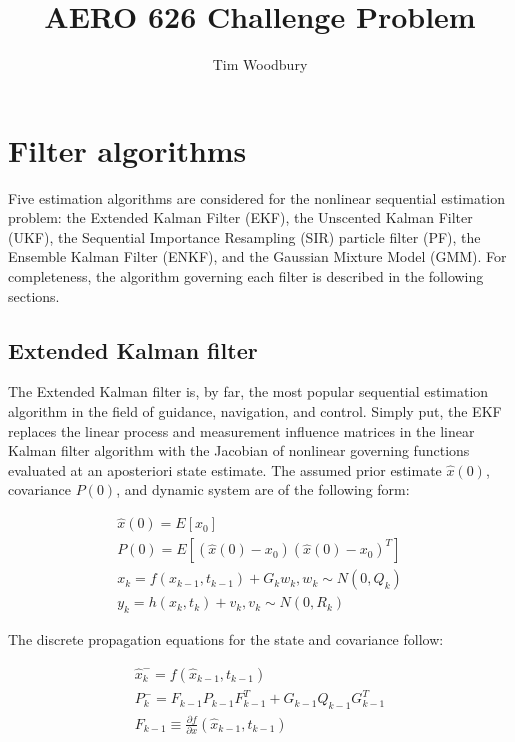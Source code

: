 \documentclass[]{article}
\title{AERO 626 Challenge Problem}
\author{Tim Woodbury}
\begin{document}

\maketitle

\section{Filter algorithms}

Five estimation algorithms are considered for the nonlinear sequential estimation problem: the Extended Kalman Filter (EKF), the Unscented Kalman Filter (UKF), the Sequential Importance Resampling (SIR) particle filter (PF), the Ensemble Kalman Filter (ENKF), and the Gaussian Mixture Model (GMM). For completeness, the algorithm governing each filter is described in the following sections.

\subsection{Extended Kalman filter}

The Extended Kalman filter is, by far, the most popular sequential estimation algorithm in the field of guidance, navigation, and control. Simply put, the EKF replaces the linear process and measurement influence matrices in the linear Kalman filter algorithm with the Jacobian of nonlinear governing functions evaluated at an aposteriori state estimate. The assumed prior estimate $\hat{x}(0)$, covariance $P(0)$, and dynamic system are of the following form:

\begin{align}
\hat{x}(0) = E[x_0] \\
P(0) = E[(\hat{x}(0)-x_0)(\hat{x}(0)-x_0)^T] \\
x_k = f(x_{k-1},t_{k-1}) + G_k w_k, w_k \sim N(0,Q_k) \\
y_k = h(x_k,t_k) + v_k, v_k \sim N(0,R_k)
\end{align}

The discrete propagation equations for the state and covariance follow:

\begin{align}
\hat{x}_{k}^- = f(\hat{x}_{k-1},t_{k-1}) \\
P_{k}^- = F_{k-1}P_{k-1}F_{k-1}^T + G_{k-1}Q_{k-1}G_{k-1}^T \\
F_{k-1} \equiv \frac{\partial f}{\partial x} (\hat{x}_{k-1},t_{k-1})
\end{align}
\end{document}
